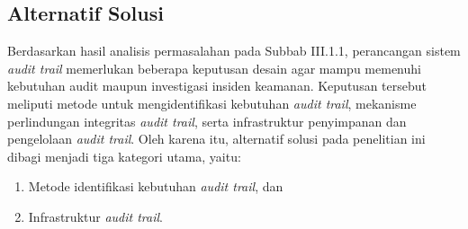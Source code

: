 \subsection{Alternatif Solusi}

Berdasarkan hasil analisis permasalahan pada Subbab III.1.1, perancangan sistem \textit{audit trail} memerlukan beberapa keputusan desain agar mampu memenuhi kebutuhan audit maupun investigasi insiden keamanan. Keputusan tersebut meliputi metode untuk mengidentifikasi kebutuhan \textit{audit trail}, mekanisme perlindungan integritas \textit{audit trail}, serta infrastruktur penyimpanan dan pengelolaan \textit{audit trail}. Oleh karena itu, alternatif solusi pada penelitian ini dibagi menjadi tiga kategori utama, yaitu:

\begin{enumerate}
    \item Metode identifikasi kebutuhan \textit{audit trail}, dan
    \item Infrastruktur \textit{audit trail}.
\end{enumerate}



